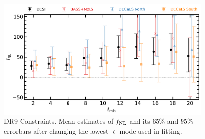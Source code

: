 \begin{figure}
    \centering
    \includegraphics[width=0.95\textwidth]{figures/fnl_elmin.pdf}     
    \caption{DR9 Constraints. Mean estimates of $f_{\rm NL}$ and its $65$\% and $95$\% errorbars after changing the lowest $\ell$ mode used in fitting.}\label{fig:mcmc_dr9elmin}
\end{figure}
